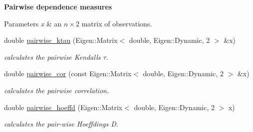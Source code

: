 \begin{Indent}{\bf Pairwise dependence measures}\par
{\em 
\begin{DoxyParams}{Parameters}
{\em x} & an $ n \times 2 $ matrix of observations. \\
\hline
\end{DoxyParams}
}\begin{DoxyCompactItemize}
\item 
double \hyperlink{namespacevinecopulib_1_1tools__stats_aa1ed1d0ae4e304aef8c05737b4bfd024}{pairwise\+\_\+ktau} (Eigen\+::\+Matrix$<$ double, Eigen\+::\+Dynamic, 2 $>$ \&x)\hypertarget{namespacevinecopulib_1_1tools__stats_aa1ed1d0ae4e304aef8c05737b4bfd024}{}\label{namespacevinecopulib_1_1tools__stats_aa1ed1d0ae4e304aef8c05737b4bfd024}

\begin{DoxyCompactList}\small\item\em calculates the pairwise Kendall\textquotesingle{}s $ \tau $. \end{DoxyCompactList}\item 
double \hyperlink{namespacevinecopulib_1_1tools__stats_ad076513f9a531a015bb0eaff098a8271}{pairwise\+\_\+cor} (const Eigen\+::\+Matrix$<$ double, Eigen\+::\+Dynamic, 2 $>$ \&x)\hypertarget{namespacevinecopulib_1_1tools__stats_ad076513f9a531a015bb0eaff098a8271}{}\label{namespacevinecopulib_1_1tools__stats_ad076513f9a531a015bb0eaff098a8271}

\begin{DoxyCompactList}\small\item\em calculates the pairwise correlation. \end{DoxyCompactList}\item 
double \hyperlink{namespacevinecopulib_1_1tools__stats_adda97526e428173da49899ef449560cf}{pairwise\+\_\+hoeffd} (Eigen\+::\+Matrix$<$ double, Eigen\+::\+Dynamic, 2 $>$ x)\hypertarget{namespacevinecopulib_1_1tools__stats_adda97526e428173da49899ef449560cf}{}\label{namespacevinecopulib_1_1tools__stats_adda97526e428173da49899ef449560cf}

\begin{DoxyCompactList}\small\item\em calculates the pair-\/wise Hoeffding\textquotesingle{}s D. \end{DoxyCompactList}\end{DoxyCompactItemize}
\end{Indent}
